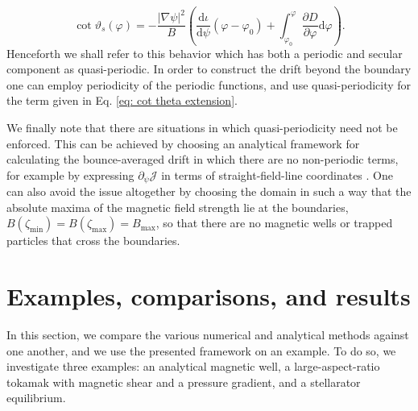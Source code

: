 \begin{equation}
    \cot \vartheta_s(\varphi) = -\frac{|\nabla \psi|^2}{B} \left( \frac{\mathrm{d} \iota}{\mathrm{d} \psi} (\varphi - \varphi_0) + \int_{\varphi_0}^{\varphi} \frac{\partial D}{\partial \varphi} \mathrm{d} \varphi \right).
    \label{eq: cot theta extension}
\end{equation}
Henceforth we shall refer to this behavior which has both a periodic and secular component as quasi-periodic. In order to construct the drift beyond the boundary one can employ periodicity of the periodic functions, and use quasi-periodicity for the term given in Eq. \eqref{eq: cot theta extension}.
\par 
We finally note that there are situations in which quasi-periodicity need not be enforced. This can be achieved by choosing an analytical framework for calculating the bounce-averaged drift in which there are no non-periodic terms, for example by expressing $\partial_\psi\mathcal{J}$ in terms of straight-field-line coordinates \cite{hegna2015effect}. One can also avoid the issue altogether by choosing the domain in such a way that the absolute maxima of the magnetic field strength lie at the boundaries, $B(\zeta_\mathrm{min})=B(\zeta_\mathrm{max})=B_\mathrm{max}$, so that there are no magnetic wells or trapped particles that cross the boundaries.
\section{Examples, comparisons, and results}
In this section, we compare the various numerical and analytical methods against one another, and we use the presented framework on an example. To do so, we investigate three examples: an analytical magnetic well, a large-aspect-ratio tokamak with magnetic shear and a pressure gradient, and a stellarator equilibrium.
